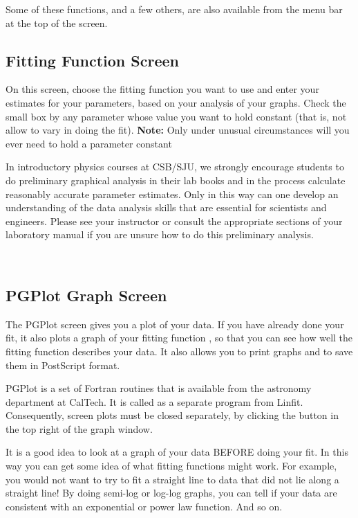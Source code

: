 Some of these functions, and a few others, are also available from the
menu bar at the top of the screen.

\subsection*{Fitting Function Screen}

On this screen, choose the fitting function you want to use and enter
your estimates for your parameters, based on your analysis of your
graphs. Check the small box by any
parameter whose value you want to hold constant (that is, not allow to
vary in doing the fit).  {\bf Note:  }Only under unusual
circumstances will you ever need to hold a parameter constant

In introductory physics courses at CSB/SJU, we strongly encourage
students to do preliminary graphical analysis in their lab books and
in the process calculate reasonably accurate parameter estimates.
Only in this way can one develop an understanding of the data analysis
skills that are essential for scientists and engineers.  Please see
your instructor or consult the appropriate sections of your laboratory
manual if you are unsure how to do this preliminary analysis.


\

\subsection*{PGPlot Graph Screen}

The PGPlot screen gives you a plot of your data.  If you have already done
your fit, it also plots a graph of your fitting function , so that you can see how well the fitting function describes your data.  It also allows you to print graphs and to save them in PostScript format.

PGPlot is a set of Fortran routines that is available from the astronomy department at CalTech.  It is called as a separate program from Linfit.  Consequently, screen plots must be closed separately, by clicking the button in the top right of the graph window.


It is a good idea to look at a graph of your data BEFORE doing your
fit.  In this way you can get some idea of what fitting functions
might work.  For example, you would not want to try to fit a straight
line to data that did not lie along a straight line!  By doing
semi-log or log-log graphs, you can tell if your data are consistent
with an exponential or power law function.  And so on.

